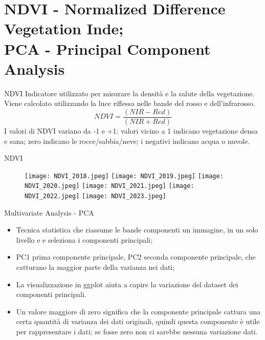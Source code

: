 \documentclass[10pt]{beamer}
\begin{document}
\section{NDVI - Normalized Difference Vegetation Inde; \\
PCA - Principal Component Analysis}

\begin{frame}{NDVI}
Indicatore utilizzato per misurare la densità e la salute della vegetazione. Viene calcolato utilizzando la luce riflessa nelle bande del rosso e dell'infrarosso.
\begin{equation}
NDVI = \frac{(NIR-Red)}{(NIR+Red)} 
\end{equation}
\label{NDVI}
I valori di NDVI variano da -1 e +1: valori vicino a 1 indicano vegetazione densa e sana; zero indicano le rocce/sabbia/neve; i negativi indicano acqua o nuvole. 
\end{frame}

\begin{frame}{NDVI}
\begin{figure}
        \centering
        \texttt{[image: NDVI\_2018.jpeg]}
        \texttt{[image: NDVI\_2019.jpeg]} 
        \texttt{[image: NDVI\_2020.jpeg]}
        \texttt{[image: NDVI\_2021.jpeg]}
        \texttt{[image: NDVI\_2022.jpeg]} 
        \texttt{[image: NDVI\_2023.jpeg]}
    \end{figure}
\end{frame}

\begin{frame}{Multivariate Analysis - PCA}
\begin{itemize}
    \item Tecnica statistica che riassume le bande componenti un immagine, in un solo livello e e seleziona i componenti principali;
    \item PC1 prima componente principale, PC2 seconda componente principale, che catturano la maggior parte della varianza nei dati; 
    \item La visualizzazione in ggplot aiuta a capire la variazione del dataset dei componenti principali.
    \item Un valore maggiore di zero significa che la componente principale cattura una certa quantità di varianza dei dati originali, quindi questa componente è utile per rappresentare i dati; se fosse zero non ci sarebbe nessuna variazione dati.
\end{itemize}
\end{frame}
\end{document}
